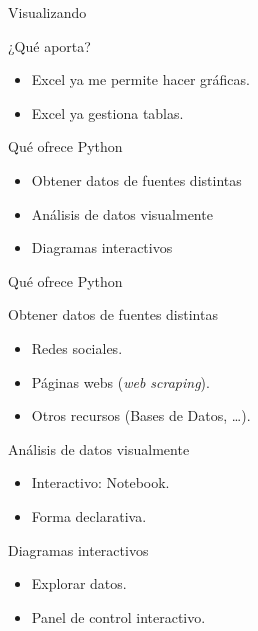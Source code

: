 \documentclass[bigger,unknownkeysallowed]{beamer}
\begin{document}
\begin{frame}[label={sec:orgdc87d67}]{Visualizando}
\begin{alertblock}{¿Qué aporta?}
\begin{itemize}
\item Excel ya me permite hacer gráficas.
\item Excel ya gestiona tablas.
\end{itemize}
\end{alertblock}

\begin{block}{Qué ofrece Python}
\begin{itemize}
\item Obtener datos de fuentes distintas

\item Análisis de datos visualmente

\item Diagramas interactivos
\end{itemize}
\end{block}
\end{frame}


\begin{frame}[label={sec:orgedd088a}]{Qué ofrece Python}
\begin{block}{Obtener datos de fuentes distintas}
\begin{itemize}
\item Redes sociales.
\item Páginas webs (\emph{web scraping}).
\item Otros recursos (Bases de Datos, \ldots{}).
\end{itemize}
\end{block}

\begin{block}{Análisis de datos visualmente}
\begin{itemize}
\item Interactivo: Notebook.

\item Forma declarativa.
\end{itemize}
\end{block}

\begin{block}{Diagramas interactivos}
\begin{itemize}
\item Explorar datos.
\item Panel de control interactivo.
\end{itemize}
\end{block}
\end{frame}
\end{document}
